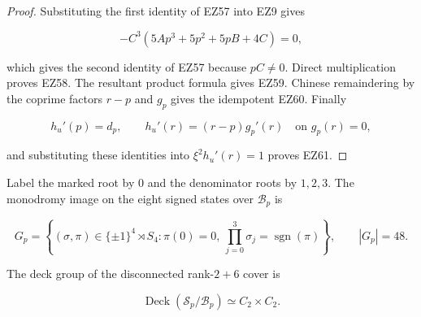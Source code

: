 \begin{proof}
Substituting the first identity of EZ57 into EZ9 gives

\[
 -C^3(5Ap^3+5p^2+5pB+4C)=0,
\]

which gives the second identity of EZ57 because \(pC\ne0\).  Direct
multiplication proves EZ58.  The resultant product formula gives EZ59.
Chinese remaindering by the coprime factors \(r-p\) and \(g_p\) gives the
idempotent EZ60.  Finally

\[
 h_u'(p)=d_p,\qquad h_u'(r)=(r-p)g_p'(r)\quad\text{on }g_p(r)=0,
\]

and substituting these identities into \(\xi^2h_u'(r)=1\) proves EZ61.
\end{proof}

\begin{theorem}
\label{thm:fixed-input-monodromy}
Label the marked root by \(0\) and the denominator roots by \(1,2,3\).  The
monodromy image on the eight signed states over \(\mathcal B_p\) is

\begin{equation}
 \boxed{
 G_p=\left\{(\sigma,\pi)\in\{\pm1\}^4\rtimes S_4:
 \pi(0)=0,
 \ \prod_{j=0}^3\sigma_j=\operatorname{sgn}(\pi)\right\},}
 \qquad |G_p|=48.                                    \tag{EZ62}
\end{equation}

The deck group of the disconnected rank-\(2+6\) cover is

\begin{equation}
 \boxed{\operatorname{Deck}(\mathcal S_p/\mathcal B_p)
 \simeq C_2\times C_2.}                              \tag{EZ63}
\end{equation}
\end{theorem}

